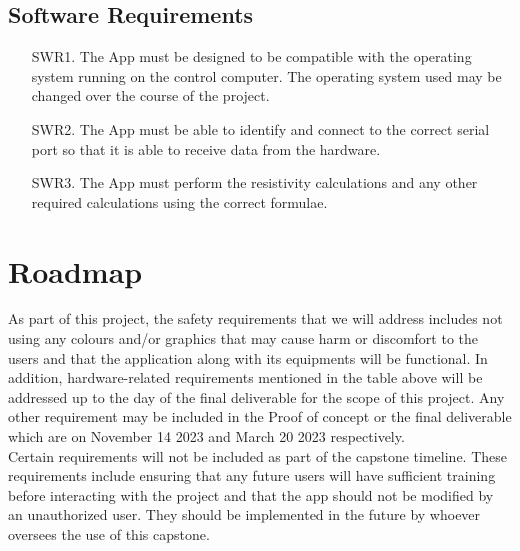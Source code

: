 \documentclass{article}
\begin{document}
\subsection*{Software Requirements}
\begin{enumerate}
  \item[SWR1.] The App must be designed to be compatible with the operating system running on the control computer. The operating system used may be changed over the course of the project. 
  \item[SWR2.] The App must be able to identify and connect to the correct serial port so that it is able to receive data from the hardware. 
  \item[SWR3.]  The App must perform the resistivity calculations and any other required calculations using the correct formulae. \\
\end{enumerate}

\section{Roadmap}

As part of this project, the safety requirements that we will address
includes not using any colours and/or graphics that may cause harm or discomfort to the users
and that the application along with its equipments will be functional.
In addition, hardware-related requirements mentioned in the table above will be addressed up to the day of the final deliverable for the scope of this project.
Any other requirement may be included in the Proof of concept or the final deliverable 
which are on November 14 2023 and March 20 2023 respectively. \\

\noindent Certain requirements will not be included as part of the capstone timeline.
These requirements include ensuring that any future users will have sufficient training before interacting with the project
and that the app should not be modified by an unauthorized user. 
They should be implemented in the future by whoever oversees the use of this capstone.



\end{document}
